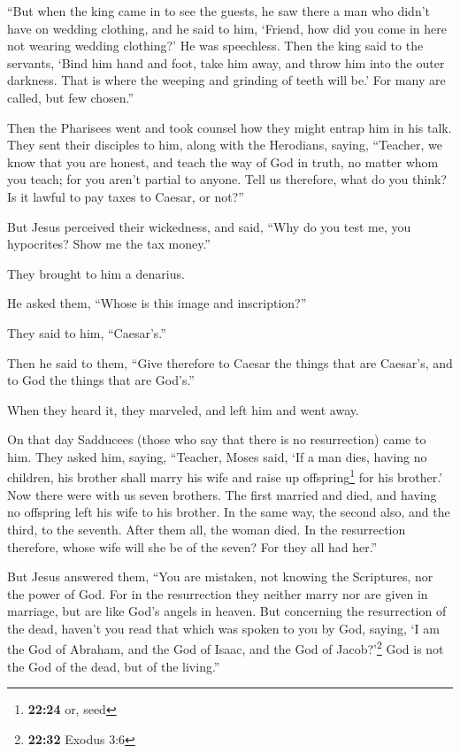  ``But when the king came in to see the guests, he saw
there a man who didn't have on wedding clothing,  and he
said to him, `Friend, how did you come in here not wearing wedding
clothing?' He was speechless.  Then the king said to the
servants, `Bind him hand and foot, take him away, and throw him into the
outer darkness. That is where the weeping and grinding of teeth will
be.'  For many are called, but few chosen.''

 Then the Pharisees went and took counsel how they might
entrap him in his talk.  They sent their disciples to
him, along with the Herodians, saying, ``Teacher, we know that you are
honest, and teach the way of God in truth, no matter whom you teach; for
you aren't partial to anyone.  Tell us therefore, what do
you think? Is it lawful to pay taxes to Caesar, or not?''

 But Jesus perceived their wickedness, and said, ``Why do
you test me, you hypocrites?  Show me the tax money.''

They brought to him a denarius.

 He asked them, ``Whose is this image and inscription?''

 They said to him, ``Caesar's.''

Then he said to them, ``Give therefore to Caesar the things that are
Caesar's, and to God the things that are God's.''

 When they heard it, they marveled, and left him and went
away.

 On that day Sadducees (those who say that there is no
resurrection) came to him. They asked him,  saying,
``Teacher, Moses said, `If a man dies, having no children, his brother
shall marry his wife and raise up offspring\footnote{\textbf{22:24} or,
  seed} for his brother.'  Now there were with us seven
brothers. The first married and died, and having no offspring left his
wife to his brother.  In the same way, the second also,
and the third, to the seventh.  After them all, the woman
died.  In the resurrection therefore, whose wife will she
be of the seven? For they all had her.''

 But Jesus answered them, ``You are mistaken, not knowing
the Scriptures, nor the power of God.  For in the
resurrection they neither marry nor are given in marriage, but are like
God's angels in heaven.  But concerning the resurrection
of the dead, haven't you read that which was spoken to you by God,
saying,  `I am the God of Abraham, and the God of Isaac,
and the God of Jacob?'\footnote{\textbf{22:32} Exodus 3:6} God is not
the God of the dead, but of the living.''

